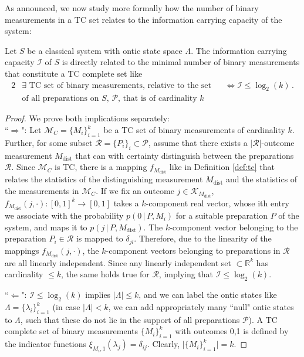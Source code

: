 As announced, we now study more formally how the number of binary measurements in a TC set relates to the information carrying capacity of the system:

\begin{lemma}
Let $S$ be a classical system with ontic state space $\Lambda$. The information carrying capacity $\mathcal{I}$ of $S$ is directly related to the minimal number of binary measurements that constitute a TC complete set like
\begin{alignat*}{2}
& \exists \text{ TC set of binary measurements, relative to the set} && \iff \mathcal{I}\leq \log_2(k)\,.\\
& \text{of all preparations on $S$, $\mathcal{P}$, that is of cardinality $k$} && 
\end{alignat*}

\end{lemma}
\begin{proof}We prove both implications separately:\\[1em]
``$\Longrightarrow$": 
Let $\mathcal{M}_C=\{M_i\}_{i=1}^k$ be a TC set of binary measurements of cardinality $k$. Further, for some subset $\mathcal{R}=\{P_i\}_i\subset\mathcal{P}$, assume that there exists a $\vert\mathcal{R}\vert$-outcome measurement $M_{\text{dist}}$ that can with certainty distinguish between the preparations $\mathcal{R}$. Since $\mathcal{M}_C$ is TC, there is a mapping $f_{M_{\text{dist}}}$ like in Definition \ref{def:tc} that relates the statistics of the distinguishing measurement $M_{\text{dist}}$ and the statistics of the measurements in $\mathcal{M}_C$. If we fix an outcome $j\in\mathcal{K}_{M_{\text{dist}}}$, ${f_{M_{\text{dist}}}(j,\cdot):[0,1]^{k}\rightarrow[0,1]}$ takes a $k$-component real vector, whose ith entry we associate with the probability $p(0\,\vert\,P,M_i)$ for a suitable preparation $P$ of the system, and maps it to $p(j\,\vert\,P,M_{\text{dist}})$. The $k$-component vector belonging to the preparation $P_i\in\mathcal{R}$ is mapped to $\delta_{jl}$. Therefore, due to the linearity of the mappings $f_{M_{\text{dist}}}(j,\cdot)$, the $k$-component vectors belonging to preparations in $\mathcal{R}$ are all linearly independent. Since any linearly independent set $\subset \mathbb{R}^k$ has cardinality $\leq k$, the same holds true for $\mathcal{R}$, implying that $\mathcal{I}\leq\log_2(k)$.

``$\Longleftarrow$": $\mathcal{I}\leq\log_2(k)$ implies $\vert\Lambda\vert\leq k$, and we can label the ontic states like $\Lambda=\{\lambda_i\}_{i=1}^k$ (in case $\vert\Lambda\vert<k$, we can add appropriately many ``null" ontic states to $\Lambda$, such that these do not lie in the support of all preparations $\mathcal{P}$). A TC complete set of binary measurements $\{M_i\}_{i=1}^k$ with outcomes 0,1 is defined by the indicator functions
$\xi_{M_i,1}(\lambda_j)=\delta_{ij}$. Clearly, $\vert \{M_i\}_{i=1}^k \vert=k$.
\end{proof}

